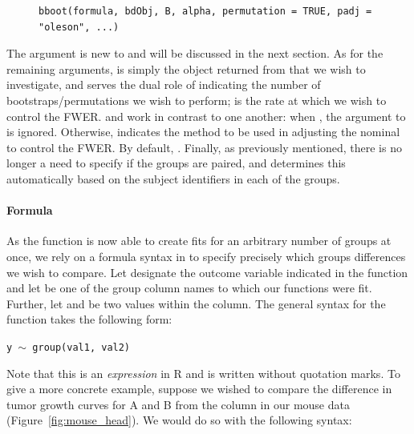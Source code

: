 \begin{singlespace}
\begin{figure}[H]
\centering
\begin{BVerbatim}
bboot(formula, bdObj, B, alpha, permutation = TRUE, padj = "oleson", ...)
\end{BVerbatim}

\end{figure}
\end{singlespace}

The  argument is new to   and will be discussed in the next section. As for the remaining arguments,  is simply the object returned from  that we wish to investigate, and  serves the dual role of indicating the number of bootstraps/permutations we wish to perform;  is the rate at which we wish to control the FWER.  and  work in contrast to one another: when , the argument to  is ignored. Otherwise,  indicates the method to be used in adjusting the nominal  to control the FWER. By default, . Finally, as previously mentioned, there is no longer a need to specify if the groups are paired, and  determines this automatically based on the subject identifiers in each of the groups.


\paragraph{Formula} \label{sec:formula}

As the  function is now able to create fits for an arbitrary number of groups at once, we rely on a formula syntax in  to specify precisely which groups differences we wish to compare. Let  designate the outcome variable indicated in the  function and let  be one of the group column names to which our functions were fit. Further, let  and  be two values within the  column. The general syntax for the  function takes the following form:


\begin{center}
\tt y $\sim$ group(val1, val2)
\end{center}

Note that this is an \textit{expression} in R and is written without quotation marks. To give a more concrete example, suppose we wished to compare the difference in tumor growth curves for A and B from the  column in our mouse data (Figure~\ref{fig:mouse_head}). We would do so with the following syntax:


